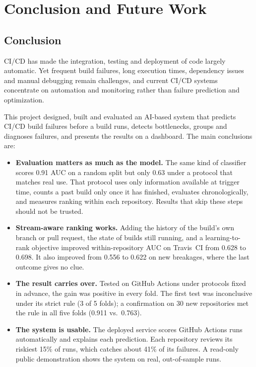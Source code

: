 \chapter{Conclusion and Future Work}
\label{ch:conclusion}

\section{Conclusion}
CI/CD has made the integration, testing and deployment of code largely automatic. Yet frequent build failures, long execution times, dependency issues and manual debugging remain challenges, and current CI/CD systems concentrate on automation and monitoring rather than failure prediction and optimization.

This project designed, built and evaluated an AI-based system that predicts CI/CD build failures before a build runs, detects bottlenecks, groups and diagnoses failures, and presents the results on a dashboard. The main conclusions are:
\begin{itemize}
\item \textbf{Evaluation matters as much as the model.} The same kind of classifier scores 0.91 AUC on a random split but only 0.63 under a protocol that matches real use. That protocol uses only information available at trigger time, counts a past build only once it has finished, evaluates chronologically, and measures ranking within each repository. Results that skip these steps should not be trusted.
\item \textbf{Stream-aware ranking works.} Adding the history of the build's own branch or pull request, the state of builds still running, and a learning-to-rank objective improved within-repository AUC on Travis~CI from 0.628 to 0.698. It also improved from 0.556 to 0.622 on new breakages, where the last outcome gives no clue.
\item \textbf{The result carries over.} Tested on GitHub Actions under protocols fixed in advance, the gain was positive in every fold. The first test was inconclusive under its strict rule (3 of 5 folds); a confirmation on 30 new repositories met the rule in all five folds (0.911 vs.\ 0.763).
\item \textbf{The system is usable.} The deployed service scores GitHub Actions runs automatically and explains each prediction. Each repository reviews its riskiest 15\% of runs, which catches about 41\% of its failures. A read-only public demonstration shows the system on real, out-of-sample runs.
\end{itemize}

